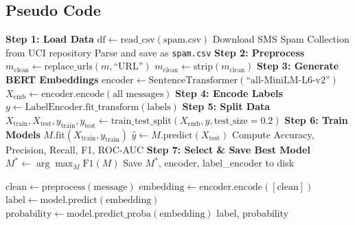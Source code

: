 \documentclass[12pt,a4paper]{article}
\begin{document}
\subsection{Pseudo Code}

\begin{algorithm}[H]
\caption{BERT Spam Classifier -- Training Pipeline}
\begin{algorithmic}[1]
    \State \textbf{Step 1: Load Data}
        \State $\text{df} \gets \text{read\_csv}(\text{spam.csv})$
    \Else
        \State Download SMS Spam Collection from UCI repository
        \State Parse and save as \texttt{spam.csv}
    \EndIf
    \State
    \State \textbf{Step 2: Preprocess}
        \State $m_{\text{clean}} \gets \text{replace\_urls}(m, \text{``URL''})$
        \State $m_{\text{clean}} \gets \text{strip}(m_{\text{clean}})$
    \EndFor
    \State
    \State \textbf{Step 3: Generate BERT Embeddings}
    \State $\text{encoder} \gets \text{SentenceTransformer}(\text{``all-MiniLM-L6-v2''})$
    \State $X_{\text{emb}} \gets \text{encoder.encode}(\text{all messages})$ 
    \State
    \State \textbf{Step 4: Encode Labels}
    \State $y \gets \text{LabelEncoder.fit\_transform}(\text{labels})$ 
    \State
    \State \textbf{Step 5: Split Data}
    \State $X_{\text{train}}, X_{\text{test}}, y_{\text{train}}, y_{\text{test}} \gets \text{train\_test\_split}(X_{\text{emb}}, y, \text{test\_size}=0.2)$
    \State
    \State \textbf{Step 6: Train Models}
        \State $M.\text{fit}(X_{\text{train}}, y_{\text{train}})$
        \State $\hat{y} \gets M.\text{predict}(X_{\text{test}})$
        \State Compute Accuracy, Precision, Recall, F1, ROC-AUC
    \EndFor
    \State
    \State \textbf{Step 7: Select \& Save Best Model}
    \State $M^{*} \gets \arg\max_{M} \text{F1}(M)$
    \State Save $M^{*}$, encoder, label\_encoder to disk
\EndProcedure
\end{algorithmic}
\end{algorithm}

\vspace{0.5cm}

\begin{algorithm}[H]
\caption{BERT Spam Classifier -- Prediction}
\begin{algorithmic}[1]
    \State $\text{clean} \gets \text{preprocess}(\text{message})$
    \State $\text{embedding} \gets \text{encoder.encode}([\text{clean}])$ 
    \State $\text{label} \gets \text{model.predict}(\text{embedding})$
    \State $\text{probability} \gets \text{model.predict\_proba}(\text{embedding})$
    \State \Return label, probability
\EndProcedure
\end{algorithmic}
\end{algorithm}
\end{document}
